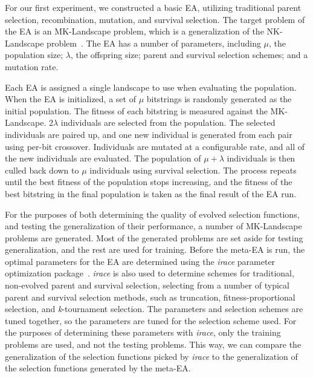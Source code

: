 \documentclass[sigconf]{acmart}
\begin{document}
For our first experiment, we constructed a basic EA, utilizing traditional parent selection, recombination, mutation, and survival selection. The target problem of the EA is an MK-Landscape problem, which is a generalization of the NK-Landscape problem~\citep{whitley2016gray,kaufmann1993origins}. The EA has a number of parameters, including $\mu$, the population size; $\lambda$, the offspring size; parent and survival selection schemes; and a mutation rate. 

Each EA is assigned a single landscape to use when evaluating the population. When the EA is initialized, a set of $\mu$ bitstrings is randomly generated as the initial population. The fitness of each bitstring is measured against the MK-Landscape. 2$\lambda$ individuals are selected from the population. The selected individuals are paired up, and one new individual is generated from each pair using per-bit crossover. Individuals are mutated at a configurable rate, and all of the new individuals are evaluated. The population of $\mu+\lambda$ individuals is then culled back down to $\mu$ individuals using survival selection. The process repeats until the best fitness of the population stops increasing, and the fitness of the best bitstring in the final population is taken as the final result of the EA run.

For the purposes of both determining the quality of evolved selection functions, and testing the generalization of their performance, a number of MK-Landscape problems are generated. Most of the generated problems are set aside for testing generalization, and the rest are used for training. Before the meta-EA is run, the optimal parameters for the EA are determined using the \textit{irace} parameter optimization package~\citep{irace}. \textit{irace} is also used to determine schemes for traditional, non-evolved parent and survival selection, selecting from a number of typical parent and survival selection methods, such as truncation, fitness-proportional selection, and \textit{k}-tournament selection. The parameters and selection schemes are tuned together, so the parameters are tuned for the selection scheme used. For the purposes of determining these parameters with \textit{irace}, only the training problems are used, and not the testing problems. This way, we can compare the generalization of the selection functions picked by \textit{irace} to the generalization of the selection functions generated by the meta-EA.
\end{document}
